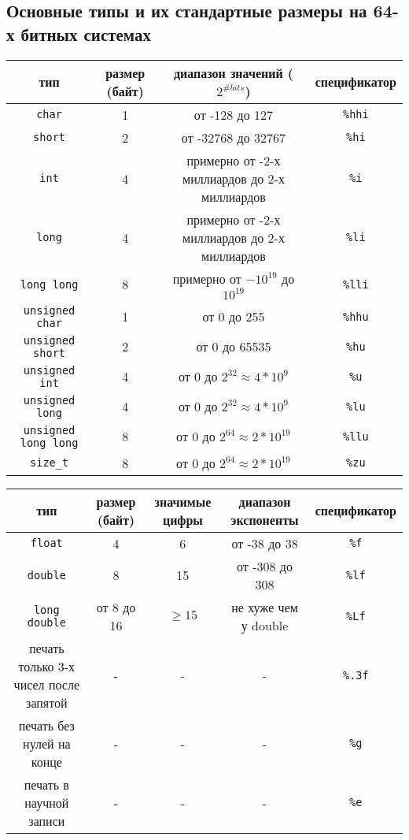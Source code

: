 \documentclass{article}
\begin{document}
\subsection*{Основные типы и их стандартные размеры на 64-х битных системах}
\begin{center}
\begin{tabular}{ c c c c }
 тип & размер (байт) & диапазон значений ($2^{\# bits}$) & спецификатор \\ \hline
 \texttt{char} & 1 & от -128 до 127 & \texttt{\%hhi} \\ 
 \texttt{short} & 2 & от -32768 до 32767 & \texttt{\%hi}  \\  
 \texttt{int} & 4 & примерно от -2-х миллиардов до 2-х миллиардов & \texttt{\%i}  \\  
 \texttt{long} & 4 & примерно от -2-х миллиардов до 2-х миллиардов & \texttt{\%li}  \\  
 \texttt{long long} & 8 & примерно от $-10^{19}$ до $10^{19}$ & \texttt{\%lli}  \\  
 \texttt{unsigned char} & 1 & от 0 до 255 & \texttt{\%hhu} \\ 
 \texttt{unsigned short} & 2 & от 0 до 65535 & \texttt{\%hu}  \\  
 \texttt{unsigned int} & 4 & от 0 до $2^{32} \approx 4*10^{9}$ & \texttt{\%u}  \\  
 \texttt{unsigned long} & 4 & от 0 до $2^{32} \approx 4*10^{9}$ & \texttt{\%lu}  \\  
 \texttt{unsigned long long} & 8 & от 0 до $2^{64} \approx 2*10^{19}$  & \texttt{\%llu}  \\  
 \texttt{size\_t} & 8 & от 0 до $2^{64} \approx 2*10^{19}$ & \texttt{\%zu} \\ \hline
\end{tabular}
\end{center}

\begin{center}
\begin{tabular}{ c c c c c }
 тип & размер (байт) & значимые цифры & диапазон экспоненты & спецификатор \\ \hline
 \texttt{float}             & 4          & 6  & от -38 до 38    & \texttt{\%f} \\ 
 \texttt{double}            & 8          & 15 & от -308 до 308  & \texttt{\%lf}  \\  
 \texttt{long double}       & от 8 до 16 & $\ge 15$  & не хуже чем у double  & \texttt{\%Lf}  \\ \hline
 печать только 3-х чисел после запятой & -          & -  & -              & \texttt{\%.3f} \\
 печать без нулей на конце & -          & -  & -              & \texttt{\%g} \\
 печать в научной записи   & -          & -  & -              & \texttt{\%e} \\\hline
\end{tabular}
\end{center}
\end{document}
